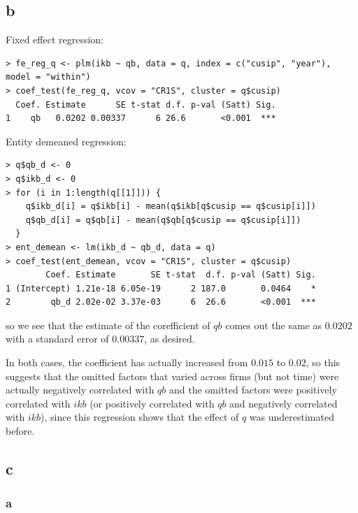 \documentclass[12pt,letterpaper]{article}
\theoremstyle{definition}
\begin{document}
\subsection*{b}

Fixed effect regression:
\begin{Verbatim}[fontsize=\small]
> fe_reg_q <- plm(ikb ~ qb, data = q, index = c("cusip", "year"), model = "within")
> coef_test(fe_reg_q, vcov = "CR1S", cluster = q$cusip)
  Coef. Estimate      SE t-stat d.f. p-val (Satt) Sig.
1    qb   0.0202 0.00337      6 26.6       <0.001  ***
\end{Verbatim}

Entity demeaned regression:
\begin{Verbatim}[fontsize=\small]
> q$qb_d <- 0
> q$ikb_d <- 0
> for (i in 1:length(q[[1]])) {
    q$ikb_d[i] = q$ikb[i] - mean(q$ikb[q$cusip == q$cusip[i]])
    q$qb_d[i] = q$qb[i] - mean(q$qb[q$cusip == q$cusip[i]])
  }
> ent_demean <- lm(ikb_d ~ qb_d, data = q)
> coef_test(ent_demean, vcov = "CR1S", cluster = q$cusip)
        Coef. Estimate       SE t-stat  d.f. p-val (Satt) Sig.
1 (Intercept) 1.21e-18 6.05e-19      2 187.0       0.0464    *
2        qb_d 2.02e-02 3.37e-03      6  26.6       <0.001  ***
\end{Verbatim}

so we see that the estimate of the corefficient of $qb$ comes out the same as $0.0202$ with a standard error of $0.00337$, as desired.

In both cases, the coefficient has actually increased from $0.015$ to $0.02$, so this suggests that the omitted factors that varied across firms (but not time) were actually negatively correlated with $qb$ and the omitted factors were positively correlated with $ikb$ (or positively correlated with $qb$ and negatively correlated with $ikb$), since this regression shows that the effect of $q$ was underestimated before.

\subsection*{c}
\subsubsection*{a}
\end{document}
